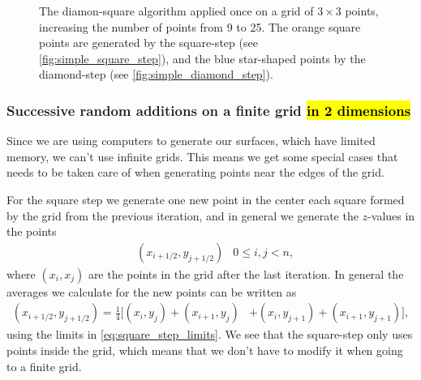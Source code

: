 \begin{figure}
    \centering
    
    \caption{
        The diamon-square algorithm applied once on a grid of $3\times 3$ points, increasing the number of points from 9 to 25. The orange square points are generated by the square-step (see \cref{fig:simple_square_step}), and the blue star-shaped points by the diamond-step (see \cref{fig:simple_diamond_step}).
    }
    \label{fig:diamond_square_applied}
\end{figure}

\subsubsection{Successive random additions on a finite grid \hl{in 2 dimensions}}
Since we are using computers to generate our surfaces, which have limited memory, we can't use infinite grids. This means we get some special cases that needs to be taken care of when generating points near the edges of the grid.

For the square step we generate one new point in the center each square formed by the grid from the previous iteration, and in general we generate the $z$-values in the points
\begin{align}
    &\left(x_{i+1/2}, y_{j+1/2}\right) &0\leq i,j < n, \label{eq:square_step_limits}
\end{align}
where $(x_i,x_j)$ are the points in the grid after the last iteration. In general the averages we calculate for the new points can be written as
\begin{align}
    (x_{i+1/2}, y_{j+1/2}) 
    = \frac{1}{4}\big[
        (x_i, y_j) + (x_{i+1}, y_j)
        &+ (x_i, y_{j+1}) + (x_{i+1}, y_{j+1})
    \big],
    \label{eq:square_step}
\end{align}
using the limits in \cref{eq:square_step_limits}. We see that the square-step only uses points inside the grid, which means that we don't have to modify it when going to a finite grid.

